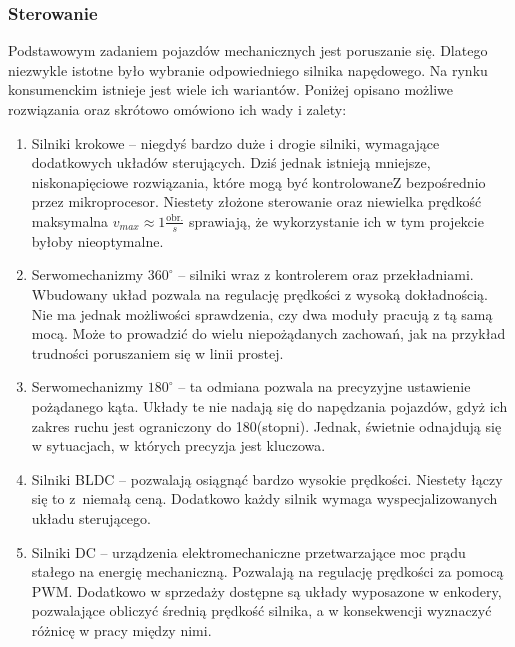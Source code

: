         \subsubsection{Sterowanie}
        \label{sec:engines}
            Podstawowym zadaniem pojazdów mechanicznych jest poruszanie się.
            Dlatego niezwykle istotne było wybranie odpowiedniego silnika napędowego.
            Na rynku konsumenckim istnieje jest wiele ich wariantów.
            Poniżej opisano możliwe rozwiązania oraz skrótowo omówiono ich wady i zalety:
            \begin{enumerate}
                \item Silniki krokowe -- niegdyś bardzo duże i drogie silniki, wymagające dodatkowych układów sterujących.
                Dziś jednak istnieją mniejsze, niskonapięciowe rozwiązania, które mogą być kontrolowaneZ bezpośrednio przez mikroprocesor.
                Niestety złożone sterowanie oraz niewielka prędkość maksymalna $v_{max} \approx 1 \frac{\text{obr.}}{s}$ sprawiają, że wykorzystanie ich w tym projekcie byłoby nieoptymalne.
                \item Serwomechanizmy $360^\circ$ -- silniki wraz z kontrolerem oraz przekładniami.
                Wbudowany układ pozwala na regulację prędkości z wysoką dokładnością.
                Nie ma jednak możliwości sprawdzenia, czy dwa moduły pracują z tą samą mocą.
                Może to prowadzić do wielu niepożądanych zachowań, jak na przykład trudności poruszaniem się w linii prostej.
                \item Serwomechanizmy $180^\circ$ -- ta odmiana pozwala na precyzyjne ustawienie pożądanego kąta.
                Układy te nie nadają się do napędzania pojazdów, gdyż ich zakres ruchu jest ograniczony do 180(stopni). Jednak, świetnie odnajdują się w sytuacjach, w których precyzja jest kluczowa.
                \item Silniki BLDC -- pozwalają osiągnąć bardzo wysokie prędkości.
                Niestety łączy się to z~niemałą ceną.
                Dodatkowo każdy silnik wymaga wyspecjalizowanych układu sterującego.
                \item Silniki DC -- urządzenia elektromechaniczne przetwarzające moc prądu stałego na energię mechaniczną.
                Pozwalają na regulację prędkości za pomocą PWM.
                Dodatkowo w sprzedaży dostępne są układy wyposazone w enkodery, pozwalające obliczyć średnią prędkość silnika, a w konsekwencji wyznaczyć różnicę w pracy między nimi.
            \end{enumerate}
